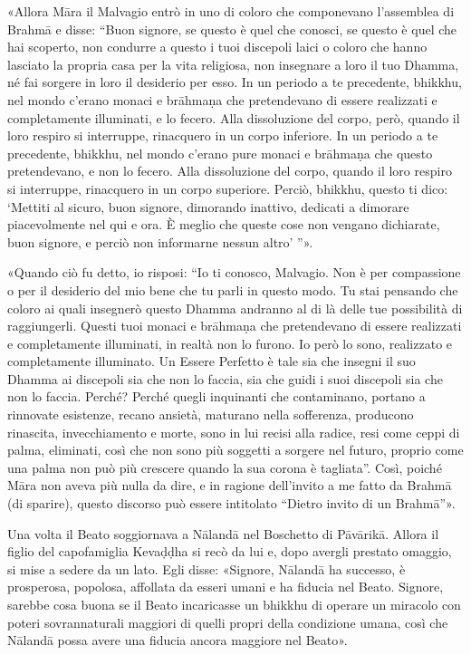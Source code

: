 «Allora Māra il Malvagio entrò in uno di coloro che componevano
l’assemblea di Brahmā e disse: “Buon signore, se questo è quel che
conosci, se questo è quel che hai scoperto, non condurre a questo i tuoi
discepoli laici o coloro che hanno lasciato la propria casa per la vita
religiosa, non insegnare a loro il tuo Dhamma, né fai sorgere in loro il
desiderio per esso. In un periodo a te precedente, bhikkhu, nel mondo
c’erano monaci e brāhmaṇa che pretendevano di essere realizzati e
completamente illuminati, e lo fecero. Alla dissoluzione del corpo,
però, quando il loro respiro si interruppe, rinacquero in un corpo
inferiore. In un periodo a te precedente, bhikkhu, nel mondo c’erano
pure monaci e brāhmaṇa che questo pretendevano, e non lo fecero. Alla
dissoluzione del corpo, quando il loro respiro si interruppe, rinacquero
in un corpo superiore. Perciò, bhikkhu, questo ti dico: ‘Mettiti al
sicuro, buon signore, dimorando inattivo, dedicati a dimorare
piacevolmente nel qui e ora. È meglio che queste cose non vengano
dichiarate, buon signore, e perciò non informarne nessun altro’ ”».


«Quando ciò fu detto, io risposi: “Io ti conosco, Malvagio. Non è per
compassione o per il desiderio del mio bene che tu parli in questo modo.
Tu stai pensando che coloro ai quali insegnerò questo Dhamma andranno al
di là delle tue possibilità di raggiungerli. Questi tuoi monaci e
brāhmaṇa che pretendevano di essere realizzati e completamente
illuminati, in realtà non lo furono. Io però lo sono, realizzato e
completamente illuminato. Un Essere Perfetto è tale sia che insegni il
suo Dhamma ai discepoli sia che non lo faccia, sia che guidi i suoi
discepoli sia che non lo faccia. Perché? Perché quegli inquinanti che
contaminano, portano a rinnovate esistenze, recano ansietà, maturano
nella sofferenza, producono rinascita, invecchiamento e morte, sono in
lui recisi alla radice, resi come ceppi di palma, eliminati, così che
non sono più soggetti a sorgere nel futuro, proprio come una palma non
può più crescere quando la sua corona è tagliata”. Così, poiché Māra non
aveva più nulla da dire, e in ragione dell’invito a me fatto da Brahmā
(di sparire), questo discorso può essere intitolato “Dietro invito di un
Brahmā”».




Una volta il Beato soggiornava a Nālandā nel Boschetto di Pāvārikā.
Allora il figlio del capofamiglia Kevaḍḍha si recò da lui e, dopo
avergli prestato omaggio, si mise a sedere da un lato. Egli disse:
«Signore, Nālandā ha successo, è prosperosa, popolosa, affollata da
esseri umani e ha fiducia nel Beato. Signore, sarebbe cosa buona se il
Beato incaricasse un bhikkhu di operare un miracolo con poteri
sovrannaturali maggiori di quelli propri della condizione umana, così
che Nālandā possa avere una fiducia ancora maggiore nel Beato».


